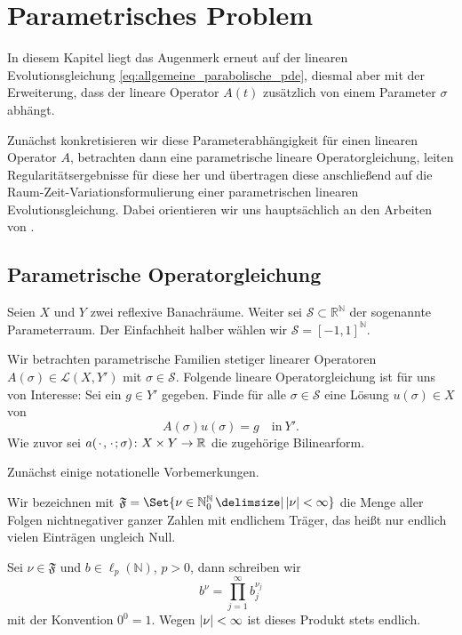 
\chapter{Parametrisches Problem} %
\label{cha:parametrisches_problem}


In diesem Kapitel liegt das Augenmerk erneut auf der linearen Evolutionsgleichung \eqref{eq:allgemeine_parabolische_pde}, diesmal aber mit der Erweiterung, dass der lineare Operator $A(t)$ zusätzlich von einem Parameter $\sigma$ abhängt.

Zunächst konkretisieren wir diese Parameterabhängigkeit für einen linearen Operator $A$, betrachten dann eine parametrische lineare Operatorgleichung, leiten Regularitätsergebnisse für diese her und übertragen diese anschließend auf die Raum-Zeit-Variationsformulierung einer parametrischen linearen Evolutionsgleichung.
Dabei orientieren wir uns hauptsächlich an den Arbeiten von \textcite{Kunoth:2013ef,Cohen:2010kz}.

\section{Parametrische Operatorgleichung} %
\label{sec:parametrische_operatorgleichung}

Seien $X$ und $Y$ zwei reflexive Banachräume.
Weiter sei $\mathcal S \subset \mathbb{R}^{\mathbb{N}}$ der sogenannte Parameterraum.
Der Einfachheit halber wählen wir $\mathcal S = [-1, 1]^{\mathbb{N}}$. %

Wir betrachten parametrische Familien stetiger linearer Operatoren $A(\sigma) \in \mathcal L(X, Y')$ mit $\sigma \in \mathcal S$.
Folgende lineare Operatorgleichung ist für uns von Interesse:
Sei ein $g \in Y'$ gegeben.
Finde für alle $\sigma \in \mathcal S$ eine Lösung $u(\sigma) \in X$ von
\begin{equation}
    \label{eq:allgemeine_parametrische_elliptische_pde}
    A(\sigma) u(\sigma) = g \quad \text{in}~Y'.
\end{equation}
Wie zuvor sei $a({\mkern2mu\cdot\mkern2mu}, {\mkern2mu\cdot\mkern2mu}; \sigma) \colon X \times Y \to \mathbb{R}$ die zugehörige Bilinearform.

Zunächst einige notationelle Vorbemerkungen.
\begin{Bemerkung}
    Wir bezeichnen mit $\mathfrak F = \Set{ \nu \in \mathbb{N}^{\mathbb{N}}_{0} \given \abs{\nu} < \infty }$ die Menge aller Folgen nichtnegativer ganzer Zahlen mit endlichem Träger, das heißt nur endlich vielen Einträgen ungleich Null.

    Sei $\nu \in \mathfrak F$ und $b \in \ell_{p}(\mathbb{N})$, $p > 0$, dann schreiben wir
    \begin{equation}
        b^{\nu} = \prod_{j = 1}^{\infty} b_{j}^{\nu_{j}}
    \end{equation}
    mit der Konvention $0^{0} = 1$.
    Wegen $\lvert\nu\rvert < \infty$ ist dieses Produkt stets endlich.
\end{Bemerkung}


